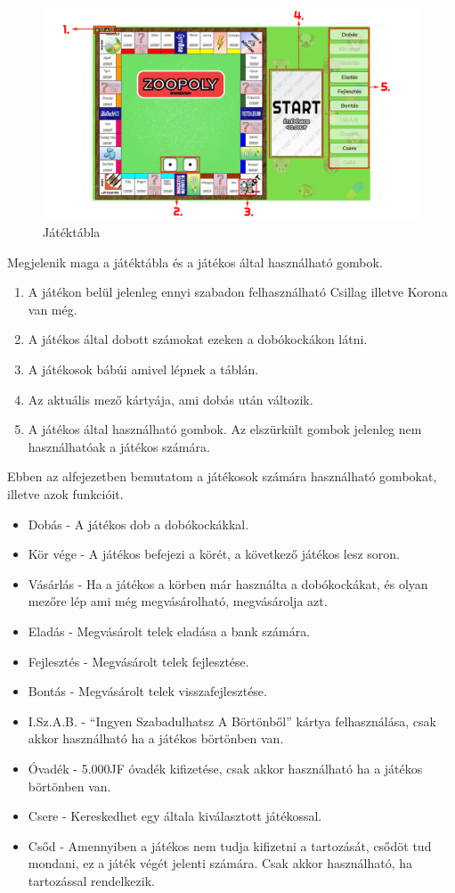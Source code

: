 \begin{figure}[h!]
\centering
\includegraphics[scale=0.25]{images/Nevtelen-3.png}
\caption{Játéktábla}
\label{fig:ff}
\end{figure}
Megjelenik maga a játéktábla és a játékos által használható gombok.
\begin{enumerate}
	\item A játékon belül jelenleg ennyi szabadon felhasználható Csillag illetve Korona van még.
	\item A játékos által dobott számokat ezeken a dobókockákon látni.
	\item A játékosok bábúi amivel lépnek a táblán.
	\item Az aktuális mező kártyája, ami dobás után változik.
	\item A játékos által használható gombok. Az elszürkült gombok jelenleg nem használhatóak a játékos számára.
\end{enumerate}


Ebben az alfejezetben bemutatom a játékosok számára használható gombokat, illetve azok funkcióit.

\begin{itemize}
	\item Dobás - A játékos dob a dobókockákkal.
	\item Kör vége - A játékos befejezi a körét, a következő játékos lesz soron.
	\item Vásárlás - Ha a játékos a körben már használta a dobókockákat, és olyan mezőre lép ami még megvásárolható, megvásárolja azt.
	\item Eladás - Megvásárolt telek eladása a bank számára.
	\item Fejlesztés - Megvásárolt telek fejlesztése.
	\item Bontás - Megvásárolt telek visszafejlesztése.
	\item I.Sz.A.B. - “Ingyen Szabadulhatsz A Börtönből” kártya felhasználása, csak akkor használható ha a játékos börtönben van.
	\item Óvadék - 5.000JF óvadék kifizetése, csak akkor használható ha a játékos börtönben van.
	\item Csere - Kereskedhet egy általa kiválasztott játékossal.
	\item Csőd - Amennyiben a játékos nem tudja kifizetni a tartozását, csődöt tud mondani, ez a játék végét jelenti számára. Csak akkor használható, ha tartozással rendelkezik.
\end{itemize}

